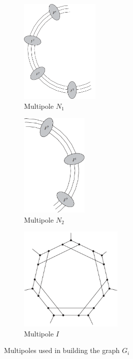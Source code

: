 \documentclass[12pt, twoside]{book}
\begin{document}
\begin{example}
	\begin{figure}
		\centering
		\begin{subfigure}[b]{0.32\textwidth}
			\centering
			\includegraphics[height=5cm, width=\textwidth, keepaspectratio]{images/Gi-first-multipole}
			\caption{Multipole $N_1$}
			\label{fig:Gi-first-multipole}
		\end{subfigure}
		\hfill
		\begin{subfigure}[b]{0.32\textwidth}
			\centering
			\includegraphics[height=5cm, width=\textwidth, keepaspectratio]{images/Gi-second-multipole}
			\caption{Multipole $N_2$}
			\label{fig:Gi-second-multipole}
		\end{subfigure}
		\hfill
		\begin{subfigure}[b]{0.32\textwidth}
			\centering
			\includegraphics[height=5cm, width=\textwidth, keepaspectratio]{images/Gi-inner-multipole}
			\caption{Multipole $I$}
			\label{fig:Gi-inner-multipole}
		\end{subfigure}
		\caption{Multipoles used in building the graph $G_i$}
	\end{figure}


\end{example}
\end{document}
